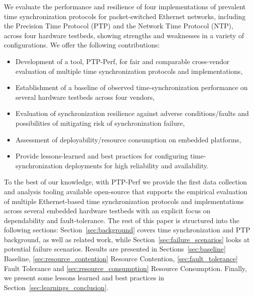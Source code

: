We evaluate the performance and resilience of four implementations of prevalent time synchronization protocols for packet-switched Ethernet networks, including the Precision Time Protocol (PTP) and the Network Time Protocol (NTP), across four hardware testbeds, showing strengths and weaknesses in a variety of configurations. We offer the following contributions:

\begin{itemize}
    \item Development of a tool, PTP-Perf, for fair and comparable cross-vendor evaluation of multiple time synchronization protocols and implementations,
    \item Establishment of a baseline of observed time-synchronization performance on several hardware testbeds across four vendors,
    \item Evaluation of synchronization resilience against adverse conditions/faults and possibilities of mitigating risk of synchronization failure,
    \item Assessment of deployability/resource consumption on embedded platforms,
    \item Provide lessons-learned and best practices for configuring time-synchronization deployments for high reliability and availability.
\end{itemize}

To the best of our knowledge, with PTP-Perf we provide the first data collection and analysis tooling available open-source that supports the empirical evaluation of multiple Ethernet-based time synchronization protocols and implementations across several embedded hardware testbeds with an explicit focus on dependability and fault-tolerance.
%
The rest of this paper is structured into the following sections: Section~\ref{sec:background} covers time synchronization and PTP background, as well as related work, while Section~\ref{sec:failure_scenarios} looks at potential failure scenarios. Results are presented in Sections~\ref{sec:baseline} Baseline, \ref{sec:resource_contention} Resource Contention, \ref{sec:fault_tolerance} Fault Tolerance and \ref{sec:resource_consumption} Resource Consumption. Finally, we present some lessons learned and best practices in Section~\ref{sec:learnings_conclusion}.